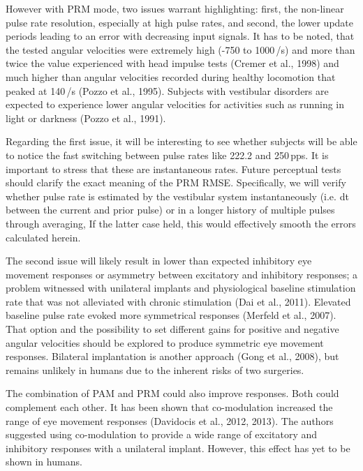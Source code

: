 However with PRM mode, two issues warrant highlighting: first, the non-linear pulse rate resolution, especially at high pulse rates, and second, the lower update periods leading to an error with decreasing input signals. It has to be noted, that the tested angular velocities were extremely high (-750 to 1000\,\degree /s) and more than twice the value experienced with head impulse tests (Cremer et al., 1998) and much higher than angular velocities recorded during healthy locomotion that peaked at 140\,\degree/s (Pozzo et al., 1995). Subjects with vestibular disorders are expected to experience lower angular velocities for activities such as running in light or darkness (Pozzo et al., 1991).

Regarding the first issue, it will be interesting to see whether subjects will be able to notice the fast switching between pulse rates like 222.2 and 250\,pps. It is important to stress that these are instantaneous rates. Future perceptual tests should clarify the exact meaning of the PRM RMSE. Specifically, we will verify whether pulse rate is estimated by the vestibular system instantaneously (i.e. dt between the current and prior pulse) or in a longer history of multiple pulses through averaging, If the latter case held, this would effectively smooth the errors calculated herein.

The second issue will likely result in lower than expected inhibitory eye movement responses or asymmetry between excitatory and inhibitory responses; a problem witnessed with unilateral implants and physiological baseline stimulation rate that was not alleviated with chronic stimulation (Dai et al., 2011). Elevated baseline pulse rate evoked more symmetrical responses (Merfeld et al., 2007). That option and the possibility to set different gains for positive and negative angular velocities should be explored to produce symmetric eye movement responses. Bilateral implantation is another approach (Gong et al., 2008), but remains unlikely in humans due to the inherent risks of two surgeries.

The combination of PAM and PRM could also improve responses. Both could complement each other. It has been shown that co-modulation increased the range of eye movement responses (Davidocis et al., 2012, 2013). The authors suggested using co-modulation to provide a wide range of excitatory and inhibitory responses with a unilateral implant. However, this effect has yet to be shown in humans.

